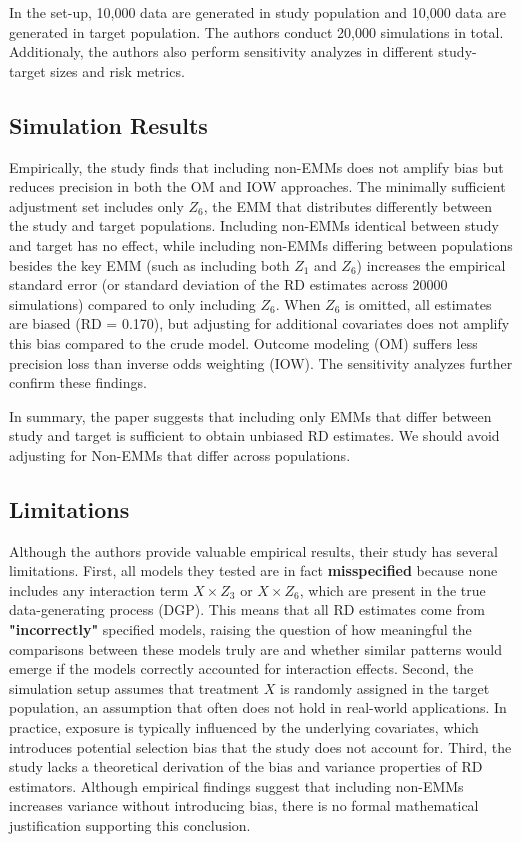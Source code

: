 \documentclass[12pt,oneside]{amsart}
\theoremstyle{definition}
\theoremstyle{remark}
\numberwithin{equation}{section}
\begin{document}
In the set-up, 10,000 data are generated in study population and 10,000 data are generated in target population. The authors conduct 20,000 simulations in total. Additionaly, the authors also perform sensitivity analyzes in different study-target sizes and risk metrics. 

\subsection{Simulation Results}
Empirically, the study finds that including non-EMMs does not amplify bias but reduces precision in both the OM and IOW approaches. The minimally sufficient adjustment set includes only \( Z_6 \), the EMM that distributes differently between the study and target populations. Including non-EMMs identical between study and target has no effect, while including non-EMMs differing between populations besides the key EMM (such as including both $Z_1$ and $Z_6$) increases the empirical standard error (or standard deviation of the RD estimates across 20000 simulations) compared to only including $Z_6$. When $Z_6$ is omitted, all estimates are biased (RD = 0.170), but adjusting for additional covariates does not amplify this bias compared to the crude model. Outcome modeling (OM) suffers less precision loss than inverse odds weighting (IOW). The sensitivity analyzes further confirm these findings. 

In summary, the paper suggests that including only EMMs that differ between study and target is sufficient to obtain unbiased RD estimates. We should avoid adjusting for Non-EMMs that differ across populations. 


\subsection{Limitations}
Although the authors provide valuable empirical results, their study has several limitations. First, all models they tested are in fact \textbf{misspecified} because none includes any interaction term \( X\times Z_3 \) or \( X\times Z_6 \), which are present in the true data-generating process (DGP). This means that all RD estimates come from \textbf{"incorrectly"} specified models, raising the question of how meaningful the comparisons between these models truly are and whether similar patterns would emerge if the models correctly accounted for interaction effects. Second, the simulation setup assumes that treatment \(X\) is randomly assigned in the target population, an assumption that often does not hold in real-world applications. In practice, exposure is typically influenced by the underlying covariates, which introduces potential selection bias that the study does not account for. Third, the study lacks a theoretical derivation of the bias and variance properties of RD estimators. Although empirical findings suggest that including non-EMMs increases variance without introducing bias, there is no formal mathematical justification supporting this conclusion.
\end{document}
